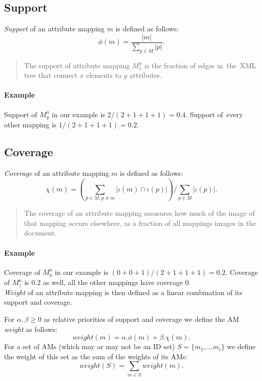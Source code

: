\subsection{Support}

\begin{define}[Support]
\textit{Support} of an attribute mapping $m$ is defined as follows:
\[\phi(m) = \frac{|m|}{\sum_{p \in M}|p|}.\]
\end{define}

\begin{quote}
The support of attribute mapping $M_x^y$ is the fraction of edges in~the~XML tree that connect $x$ elements to $y$ attributes.
\end{quote}

\paragraph{Example}
Support of $M_{y}^{a}$ in our example is $2 / (2+1+1+1) = 0.4$. Support of~every other mapping is $1 / (2+1+1+1) = 0.2$.\\

\subsection{Coverage}

\begin{define}[Coverage]
\textit{Coverage} of an attribute mapping $m$ is defined as follows:
\[\chi(m) = \left( \sum_{p \in M, p \neq m} |\iota(m) \cap \iota(p)| \right) / \sum_{p \in M} |\iota(p)|.\]
\end{define}

\begin{quote}
The coverage of an attribute mapping measures how much of the image of that mapping occurs elsewhere, as a fraction of all mappings images in the document.
\end{quote}

\paragraph{Example}
Coverage of $M_{y}^{a}$ in our example is $(0+0+1) / (2+1+1+1) = 0.2$. Coverage of $M_{z}^{a}$ is $0.2$ as well, all the other mappings have coverage $0$.
\\

\textit{Weight} of an attribute mapping is then defined as a linear combination of its support and coverage.

\begin{define}[Weight]
For $\alpha, \beta \geq 0$ as relative priorities of support and coverage we define the AM \textit{weight} as follows:
\[weight(m) = \alpha . \phi(m) + \beta . \chi(m).\]
For a set of AMs (which may or may not be an ID set) $S = \{m_1, \ldots m_i\}$ we define the weight of this set as the sum of the weights of its AMs:
\[weight(S) = \sum_{m \in S} weight(m).\]
\end{define}

